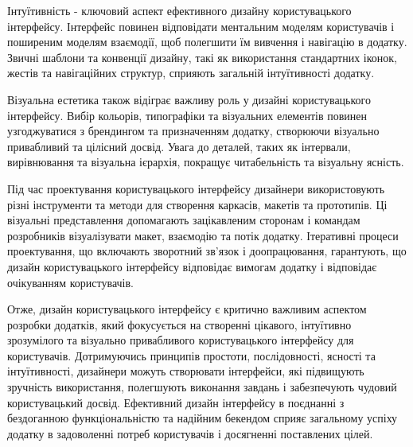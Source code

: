 Інтуїтивність - ключовий аспект ефективного дизайну користувацького інтерфейсу. Інтерфейс повинен відповідати ментальним моделям користувачів і поширеним моделям взаємодії, щоб полегшити їм вивчення і навігацію в додатку. Звичні шаблони та конвенції дизайну, такі як використання стандартних іконок, жестів та навігаційних структур, сприяють загальній інтуїтивності додатку.

Візуальна естетика також відіграє важливу роль у дизайні користувацького інтерфейсу. Вибір кольорів, типографіки та візуальних елементів повинен узгоджуватися з брендингом та призначенням додатку, створюючи візуально привабливий та цілісний досвід. Увага до деталей, таких як інтервали, вирівнювання та візуальна ієрархія, покращує читабельність та візуальну ясність.

Під час проектування користувацького інтерфейсу дизайнери використовують різні інструменти та методи для створення каркасів, макетів та прототипів. Ці візуальні представлення допомагають зацікавленим сторонам і командам розробників візуалізувати макет, взаємодію та потік додатку. Ітеративні процеси проектування, що включають зворотний зв'язок і доопрацювання, гарантують, що дизайн користувацького інтерфейсу відповідає вимогам додатку і відповідає очікуванням користувачів.

Отже, дизайн користувацького інтерфейсу є критично важливим аспектом розробки додатків, який фокусується на створенні цікавого, інтуїтивно зрозумілого та візуально привабливого користувацького інтерфейсу для користувачів. Дотримуючись принципів простоти, послідовності, ясності та інтуїтивності, дизайнери можуть створювати інтерфейси, які підвищують зручність використання, полегшують виконання завдань і забезпечують чудовий користувацький досвід. Ефективний дизайн інтерфейсу в поєднанні з бездоганною функціональністю та надійним бекендом сприяє загальному успіху додатку в задоволенні потреб користувачів і досягненні поставлених цілей.




% 

% 

% 

% 